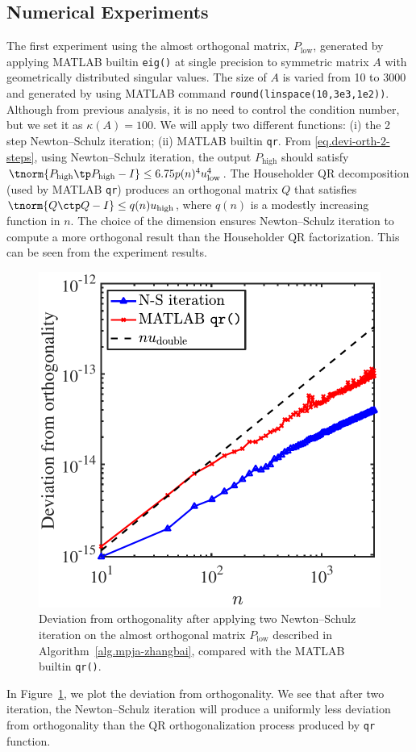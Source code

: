 \documentclass{article}
\numberwithin{equation}{section} %
\begin{document}
\subsection{Numerical Experiments}
\begin{example}\label{eg.qr-ns}
The first experiment using the almost orthogonal matrix, $P_{\mathrm{low}}$, 
generated by applying MATLAB builtin \texttt{eig()} at single precision to
symmetric matrix $A$ with geometrically distributed singular values.
The size of $A$ is varied from 10 to 3000 and generated by using MATLAB
command \texttt{round(linspace(10,3e3,1e2))}.
Although from previous analysis, it is no need to control the condition
number, but we set it as $\kappa(A) = 100$.
We will apply two different functions: (i) the 2 step Newton--Schulz
iteration; (ii) MATLAB builtin \texttt{qr}.
From \eqref{eq.devi-orth-2-steps}, using Newton--Schulz iteration, the
output $P_{\mathrm{high}}$ should satisfy $\tnorm{P_{\mathrm{high}}\tp
  P_{\mathrm{high}} - I} \le 6.75p(n)^{4}u_{\mathrm{low}}^{4}$. The
Householder QR decomposition (used by MATLAB \texttt{qr}) produces an
orthogonal matrix $Q$ that satisfies $\tnorm{Q\ctp Q - I} \le
q(n)u_{\mathrm{high}}$, where $q(n)$ is a modestly increasing function in
$n$. The choice of the dimension ensures Newton--Schulz iteration to
compute a more orthogonal result than the Householder QR factorization.
This can be seen from the experiment results. 

\begin{figure}[H]
\centering
\includegraphics[width = 0.5 \textwidth]{./figs/ns-hqr.pdf}
\caption{Deviation from orthogonality after applying two Newton--Schulz
  iteration on the almost orthogonal matrix $P_{\mathrm{low}}$ described in
  Algorithm~\ref{alg.mpja-zhangbai}, compared with the MATLAB builtin
  \texttt{qr()}.} 
\label{fig.orthog-ns-qr}
\end{figure}

In Figure~\ref{fig.orthog-ns-qr}, we plot the deviation from orthogonality.
We see that after two iteration, the Newton--Schulz iteration will produce
a uniformly less deviation from orthogonality than the QR orthogonalization
process produced by \texttt{qr} function.
\end{example}
\end{document}
